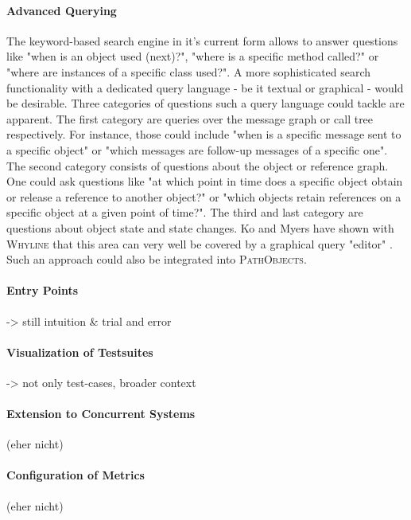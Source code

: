 \paragraph{Advanced Querying} The keyword-based search engine in it's current form allows to answer questions like "when is an object used (next)?", "where is a specific method called?" or "where are instances of a specific class used?".
A more sophisticated search functionality with a dedicated query language - be it textual or graphical - would be desirable.
Three categories of questions such a query language could tackle are apparent.
The first category are queries over the message graph or call tree respectively.
For instance, those could include "when is a specific message sent to a specific object" or "which messages are follow-up messages of a specific one".
The second category consists of questions about the object or reference graph.
One could ask questions like "at which point in time does a specific object obtain or release a reference to another object?" or "which objects retain references on a specific object at a given point of time?".
The third and last category are questions about object state and state changes.
Ko and Myers have shown with \textsc{Whyline} that this area can very well be covered by a graphical query "editor" \cite{ko_debugging_2008}.
Such an approach could also be integrated into \textsc{PathObjects}.

\paragraph{Entry Points} -> still intuition \& trial and error

\paragraph{Visualization of Testsuites} -> not only test-cases, broader context

\paragraph{Extension to Concurrent Systems} (eher nicht)

\paragraph{Configuration of Metrics} (eher nicht)